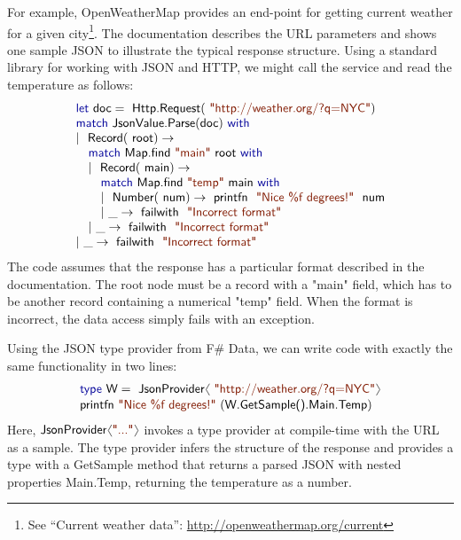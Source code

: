 \documentclass[10pt,preprint,clearpagebib]{sigplanconf}
\newcommand{\langl}{\begin{picture}(4.5,7)
\put(1.1,2.5){\rotatebox{60}{\line(1,0){5.5}}}
\put(1.1,2.5){\rotatebox{300}{\line(1,0){5.5}}}
\end{picture}}
\newcommand{\rangl}{\begin{picture}(4.5,7)
\put(.9,2.5){\rotatebox{120}{\line(1,0){5.5}}}
\put(.9,2.5){\rotatebox{240}{\line(1,0){5.5}}}
\end{picture}}
\newcommand{\kvd}[1]{\textnormal{\textcolor{kvdclr}{\sffamily #1}}}
\newcommand{\str}[1]{\textnormal{\textcolor{strclr}{\sffamily "#1"}}}
\newcommand{\ident}[1]{\textnormal{\sffamily #1}}
\begin{document}
For example, OpenWeatherMap provides an end-point for getting current weather for a 
given city\footnote{See ``Current weather data'': \url{http://openweathermap.org/current}}. 
The documentation describes the URL parameters and shows one sample JSON to illustrate the typical
response structure. Using a standard library for working with JSON and HTTP, we might call the 
service and read the temperature as follows:
%
\begin{equation*}
\begin{array}{l}
 \kvd{let}~\ident{doc}=\ident{Http.Request}(\str{http://weather.org/?q=NYC}) \\
 \kvd{match}~\ident{JsonValue.Parse}(\ident{doc})~\kvd{with} \\
 |~\ident{Record}(\ident{root})\rightarrow \\
 \quad \kvd{match}~\ident{Map.find}~\str{main}~\ident{root}~\kvd{with} \\
 \quad |~\ident{Record}(\ident{main})\rightarrow \\
 \quad \quad \kvd{match}~\ident{Map.find}~\str{temp}~\ident{main}~\kvd{with} \\
 \quad \quad |~\ident{Number}(\ident{num})\rightarrow \ident{printfn}~\str{Nice \%f degrees!}~\ident{num} \\
 \quad \quad |~\_\rightarrow \ident{failwith}~\str{Incorrect format} \\
 \quad |~\_\rightarrow \ident{failwith}~\str{Incorrect format} \\
 |~\_\rightarrow \ident{failwith}~\str{Incorrect format} 
\end{array}
\end{equation*}
%
The code assumes that the response has a particular format described in the documentation. The
root node must be a record with a \str{main} field, which has to be another record containing
a numerical \str{temp} field. When the format is incorrect, the data access simply fails
with an exception.

Using the JSON type provider from F\# Data, we can write code with exactly the 
same functionality in two lines:
%
\begin{equation*}
\begin{array}{l}
 \kvd{type}~\ident{W} = \ident{JsonProvider}\langl\str{http://weather.org/?q=NYC}\rangl \\[0.1em]
 \ident{printfn}~\str{Nice \%f degrees!}~(\ident{W.GetSample().Main.Temp})
\end{array}
\end{equation*}
%
Here, $\ident{JsonProvider}\langl\str{...}\rangl$ invokes a type provider at 
compile-time with the URL as a sample. The type provider infers the structure of the response
and provides a type with a \ident{GetSample} method that returns a parsed JSON with nested
properties \ident{Main.Temp}, returning the temperature as a number.
\end{document}
